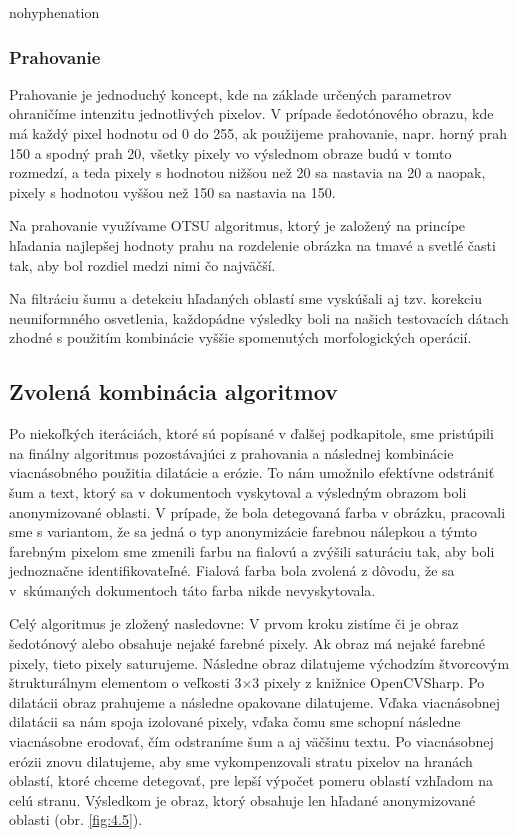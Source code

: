 \begin{hyphenrules}{nohyphenation}
\subsubsection{Prahovanie}
    
Prahovanie je jednoduchý koncept, kde na základe určených parametrov ohraničíme intenzitu jednotlivých pixelov. V prípade šedotónového obrazu, kde má každý pixel hodnotu od 0 do 255, ak použijeme prahovanie, napr. horný prah 150 a spodný prah 20, všetky pixely vo výslednom obraze budú v tomto rozmedzí, a teda pixely s hodnotou nižšou než 20 sa nastavia na 20 a naopak, pixely s hodnotou vyššou než 150 sa nastavia na 150.
\newline

Na prahovanie využívame OTSU algoritmus\cite{otsu}, ktorý je založený na princípe hľadania najlepšej hodnoty prahu na rozdelenie obrázka na tmavé a svetlé časti tak, aby bol rozdiel medzi nimi čo najväčší.
\newline

Na filtráciu šumu a detekciu hľadaných oblastí sme vyskúšali aj tzv. korekciu neuniformného osvetlenia\cite{plantcv}, každopádne výsledky boli na našich testovacích dátach zhodné s použitím kombinácie vyššie spomenutých morfologických operácií.

\subsection{Zvolená kombinácia algoritmov}
\label{chap:4.1.2}
Po niekoľkých iteráciách, ktoré sú popísané v ďalšej podkapitole, sme pristúpili na finálny algoritmus pozostávajúci z prahovania a následnej kombinácie viacnásobného použitia dilatácie a erózie. To nám umožnilo efektívne odstrániť šum a text, ktorý sa v dokumentoch vyskytoval a výsledným obrazom boli anonymizované oblasti. V prípade, že bola detegovaná farba v obrázku, pracovali sme s variantom, že sa jedná o typ anonymizácie farebnou nálepkou a týmto farebným pixelom sme zmenili farbu na fialovú a zvýšili saturáciu tak, aby boli jednoznačne identifikovateľné. Fialová farba bola zvolená z dôvodu, že sa v~skúmaných dokumentoch táto farba nikde nevyskytovala. 
\newline

Celý algoritmus je zložený nasledovne:
V prvom kroku zistíme či je obraz šedotónový alebo obsahuje nejaké farebné pixely. Ak obraz má nejaké farebné pixely, tieto pixely saturujeme. Následne obraz dilatujeme východzím štvorcovým štrukturálnym elementom o veľkosti 3$\times$3 pixely z knižnice OpenCVSharp\cite{opencv}. Po dilatácii obraz prahujeme a následne opakovane dilatujeme. Vďaka viacnásobnej dilatácii sa nám spoja izolované pixely, vďaka čomu sme schopní následne viacnásobne erodovať, čím odstraníme šum a aj väčšinu textu. Po viacnásobnej erózii znovu dilatujeme, aby sme vykompenzovali stratu pixelov na hranách oblastí, ktoré chceme detegovať, pre lepší výpočet pomeru oblastí vzhľadom na celú stranu. Výsledkom je obraz, ktorý obsahuje len hľadané anonymizované oblasti (obr. \ref{fig:4.5}).


\end{hyphenrules}
